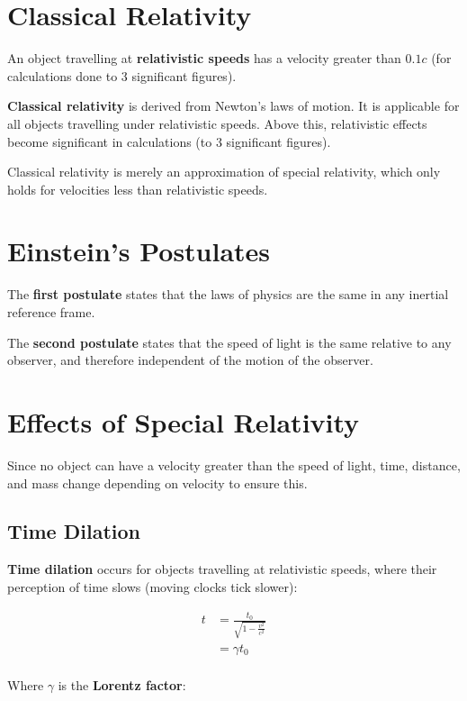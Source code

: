 \documentclass[a4paper,11pt]{report}
\begin{document}
\section{Classical Relativity}

An object travelling at \textbf{relativistic speeds} has a velocity greater
than $0.1c$ (for calculations done to 3 significant figures).

\textbf{Classical relativity} is derived from Newton's laws of motion. It is
applicable for all objects travelling under relativistic speeds. Above this,
relativistic effects become significant in calculations (to 3 significant
figures).

Classical relativity is merely an approximation of special relativity, which
only holds for velocities less than relativistic speeds.


\section{Einstein's Postulates}

The \textbf{first postulate} states that the laws of physics are the same in
any inertial reference frame.

The \textbf{second postulate} states that the speed of light is the same
relative to any observer, and therefore independent of the motion of the
observer.


\section{Effects of Special Relativity}

Since no object can have a velocity greater than the speed of light, time,
distance, and mass change depending on velocity to ensure this.

\subsection{Time Dilation}

\textbf{Time dilation} occurs for objects travelling at relativistic speeds,
where their perception of time slows (moving clocks tick slower):

$$
\begin{aligned}
t & = \frac{t_0}{\sqrt{1 - \frac{v^2}{c^2}}} \\
& = \gamma t_0 \\
\end{aligned}
$$

Where $\gamma$ is the \textbf{Lorentz factor}:
\end{document}
